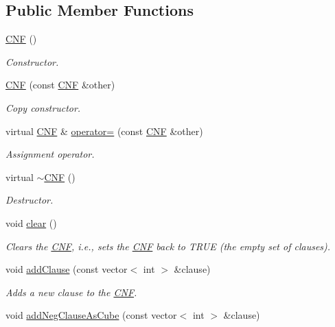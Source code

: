 \subsection*{Public Member Functions}
\begin{DoxyCompactItemize}
\item 
\hyperlink{classCNF_a69a2e604fd0dc79be4799ff90c7ef362}{C\-N\-F} ()
\begin{DoxyCompactList}\small\item\em Constructor. \end{DoxyCompactList}\item 
\hyperlink{classCNF_acdf16631121bace295ef4440f8a38777}{C\-N\-F} (const \hyperlink{classCNF}{C\-N\-F} \&other)
\begin{DoxyCompactList}\small\item\em Copy constructor. \end{DoxyCompactList}\item 
virtual \hyperlink{classCNF}{C\-N\-F} \& \hyperlink{classCNF_aa61ef2c2b49d4182993ccbd0e7877322}{operator=} (const \hyperlink{classCNF}{C\-N\-F} \&other)
\begin{DoxyCompactList}\small\item\em Assignment operator. \end{DoxyCompactList}\item 
virtual \hyperlink{classCNF_abc31a76163fb0d56de79d2e228a3f3d1}{$\sim$\-C\-N\-F} ()
\begin{DoxyCompactList}\small\item\em Destructor. \end{DoxyCompactList}\item 
void \hyperlink{classCNF_aa6b76fdc15481f7899d71f7cc8fa5f45}{clear} ()
\begin{DoxyCompactList}\small\item\em Clears the \hyperlink{classCNF}{C\-N\-F}, i.\-e., sets the \hyperlink{classCNF}{C\-N\-F} back to T\-R\-U\-E (the empty set of clauses). \end{DoxyCompactList}\item 
void \hyperlink{classCNF_af3d87d407464eeda15426bdd75f15a7f}{add\-Clause} (const vector$<$ int $>$ \&clause)
\begin{DoxyCompactList}\small\item\em Adds a new clause to the \hyperlink{classCNF}{C\-N\-F}. \end{DoxyCompactList}\item 
void \hyperlink{classCNF_a1e98842bbdcb8666d40289b15b943682}{add\-Neg\-Clause\-As\-Cube} (const vector$<$ int $>$ \&clause)

\end{DoxyCompactItemize}
